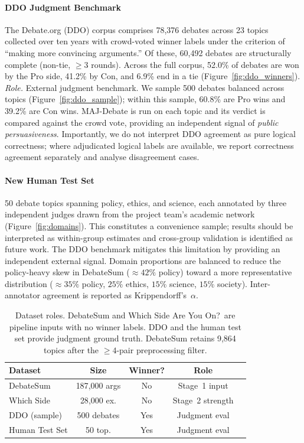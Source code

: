 \documentclass[11pt,twocolumn,letterpaper]{article}
\newcommand{\DebateSumArgs}{187{,}000}
\newcommand{\WhichSideArgs}{28{,}000}
\newcommand{\HumanTestTopics}{50}
\newcommand{\MinArgPairs}{4}
\newcommand{\NTopicsKept}{9{,}864}
\newcommand{\DDOTotal}{78{,}376}
\newcommand{\DDOTopics}{23}
\newcommand{\DDOSample}{500}
\newcommand{\DDOComplete}{60{,}492}
\newcommand{\DDOProWin}{52.0}
\newcommand{\DDOConWin}{41.2}
\newcommand{\DDOTie}{6.9}
\newcommand{\DDOModalRounds}{3}
\newcommand{\DDOSamplePro}{60.8}
\newcommand{\DDOSampleCon}{39.2}
\begin{document}
\paragraph{DDO Judgment Benchmark~\citep{durmus2019ddo}}
The Debate.org (DDO) corpus comprises \DDOTotal{} debates across
\DDOTopics{} topics collected over ten years with crowd-voted winner
labels under the criterion of ``making more convincing arguments.''
Of these, \DDOComplete{} debates are structurally complete (non-tie,
$\geq\DDOModalRounds{}$ rounds). Across the full corpus, \DDOProWin\% of
debates are won by the Pro side, \DDOConWin\% by Con, and \DDOTie\% end
in a tie (Figure~\ref{fig:ddo_winners}).
\textit{Role.} External judgment benchmark. We sample \DDOSample{} debates
balanced across topics (Figure~\ref{fig:ddo_sample}); within this sample,
\DDOSamplePro\% are Pro wins and \DDOSampleCon\% are Con wins.
MAJ-Debate is run on each topic and its verdict is compared against the
crowd vote, providing an independent signal of \textit{public
persuasiveness}. Importantly, we do not interpret DDO agreement as pure
logical correctness; where adjudicated logical labels are available, we
report correctness agreement separately and analyse disagreement cases.

\paragraph{New Human Test Set}
\HumanTestTopics{} debate topics spanning policy, ethics, and science, each
annotated by three independent judges drawn from the project team's academic
network (Figure~\ref{fig:domains}). This constitutes a convenience sample;
results should be interpreted as within-group estimates and cross-group
validation is identified as future work. The DDO benchmark mitigates this
limitation by providing an independent external signal. Domain proportions
are balanced to reduce the policy-heavy skew in DebateSum
(${\approx}42\%$ policy) toward a more representative distribution
(${\approx}35\%$ policy, $25\%$ ethics, $15\%$ science, $15\%$ society).
Inter-annotator agreement is reported as Krippendorff's~$\alpha$.

\begin{table}[h]
\centering\small
\setlength{\tabcolsep}{3pt}
\begin{tabular}{lcccc}
\toprule
\textbf{Dataset} & \textbf{Size} & \textbf{Winner?} & \textbf{Role}\\
\midrule
DebateSum        & \DebateSumArgs{} args  & No  & Stage~1 input \\
Which Side       & \WhichSideArgs{} ex.   & No  & Stage~2 strength \\
DDO (sample)     & \DDOSample{} debates   & Yes & Judgment eval \\
Human Test Set   & \HumanTestTopics{} top.& Yes & Judgment eval \\
\bottomrule
\end{tabular}
\caption{Dataset roles. DebateSum and Which Side Are You On?\ are pipeline
inputs with no winner labels. DDO and the human test set provide judgment
ground truth. DebateSum retains \NTopicsKept{} topics after the
$\geq\MinArgPairs$-pair preprocessing filter.}
\label{tab:datasets}
\end{table}
\end{document}
